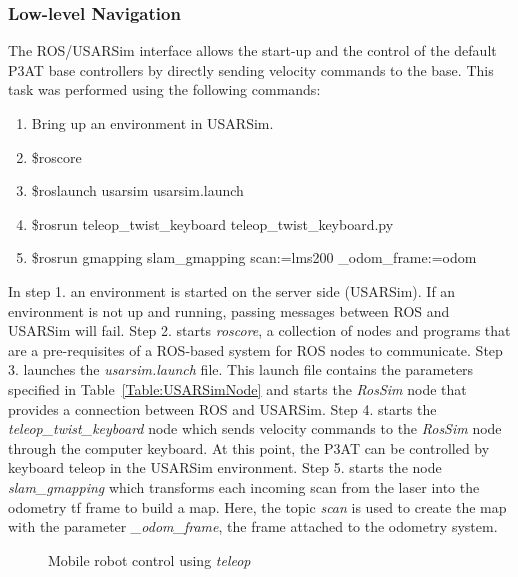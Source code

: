 \subsubsection*{Low-level Navigation}
The ROS/USARSim interface allows the start-up and the control of the default P3AT base controllers by directly sending velocity commands to the base. This task was performed using the following commands:
\begin{enumerate}
\item\footnotesize{Bring up an environment in USARSim.        }
\item\footnotesize{\$roscore}
\item\footnotesize{\$roslaunch usarsim usarsim.launch}
\item\footnotesize{\$rosrun teleop\_twist\_keyboard teleop\_twist\_keyboard.py}
\item\footnotesize{\$rosrun gmapping slam\_gmapping scan:=lms200 \_odom\_frame:=odom}
\end{enumerate}

In step 1. an environment is started on the server side (USARSim). If an environment is not up and running, passing messages between ROS and USARSim will fail. Step 2. starts {\it roscore}, a collection of nodes and programs that are a pre-requisites of a ROS-based system for ROS nodes to communicate. Step 3. launches the {\it usarsim.launch} file. This launch file contains the parameters specified in Table~\ref{Table:USARSimNode} and starts the {\it RosSim} node that provides a connection between ROS and USARSim. Step 4. starts the {\it teleop\_twist\_keyboard} node which sends velocity commands to the {\it RosSim} node through the computer keyboard. At this point, the P3AT can be controlled by keyboard teleop in the USARSim environment. Step 5. starts the node {\it slam\_gmapping} which transforms each incoming scan from the laser into the odometry tf frame to build a map. Here, the topic {\it scan} is used to create the map with the parameter {\it \_odom\_frame}, the frame attached to the odometry system.


\begin{figure}[t!]
\centering
{}
\caption{\label{fig:teleop}Mobile robot control using {\it teleop}}
\end{figure}


